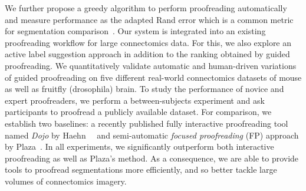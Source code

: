 We further propose a greedy algorithm to perform proofreading automatically and measure performance as the adapted Rand error which is a common metric for segmentation comparison~\cite{RAND}. 
Our system is integrated into an existing proofreading workflow for large connectomics data. For this, we also explore an active label suggestion approach in addition to the ranking obtained by guided proofreading. We quantitatively validate automatic and human-driven variations of guided proofreading on five different real-world connectomics datasets of mouse as well as fruitfly (drosophila) brain. To study the performance of novice and expert proofreaders, we perform a between-subjects experiment and ask participants to proofread a publicly available dataset. For comparison, we establish two baselines: a recently published fully interactive proofreading tool named \textit{Dojo} by Haehn~\etal~\cite{haehn_dojo_2014} and semi-automatic \textit{focused proofreading} (FP) approach by Plaza~\cite{focused_proofreading}. In all experiments, we significantly outperform both interactive proofreading as well as Plaza's method. As a consequence, we are able to provide tools to proofread segmentations more efficiently, and so better tackle large volumes of connectomics imagery.

